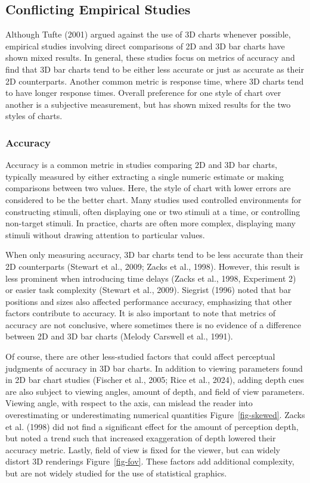 \documentclass[phd]{nuthesis}
\begin{document}
\subsection{Conflicting Empirical
Studies}\label{conflicting-empirical-studies}

Although Tufte (2001) argued against the use of 3D charts whenever
possible, empirical studies involving direct comparisons of 2D and 3D
bar charts have shown mixed results. In general, these studies focus on
metrics of accuracy and find that 3D bar charts tend to be either less
accurate or just as accurate as their 2D counterparts. Another common
metric is response time, where 3D charts tend to have longer response
times. Overall preference for one style of chart over another is a
subjective measurement, but has shown mixed results for the two styles
of charts.

\subsubsection{Accuracy}\label{accuracy}

Accuracy is a common metric in studies comparing 2D and 3D bar charts,
typically measured by either extracting a single numeric estimate or
making comparisons between two values. Here, the style of chart with
lower errors are considered to be the better chart. Many studies used
controlled environments for constructing stimuli, often displaying one
or two stimuli at a time, or controlling non-target stimuli. In
practice, charts are often more complex, displaying many stimuli without
drawing attention to particular values.

When only measuring accuracy, 3D bar charts tend to be less accurate
than their 2D counterparts (Stewart et al., 2009; Zacks et al., 1998).
However, this result is less prominent when introducing time delays
(Zacks et al., 1998, Experiment 2) or easier task complexity (Stewart et
al., 2009). Siegrist (1996) noted that bar positions and sizes also
affected performance accuracy, emphasizing that other factors contribute
to accuracy. It is also important to note that metrics of accuracy are
not conclusive, where sometimes there is no evidence of a difference
between 2D and 3D bar charts (Melody Carswell et al., 1991).

Of course, there are other less-studied factors that could affect
perceptual judgments of accuracy in 3D bar charts. In addition to
viewing parameters found in 2D bar chart studies (Fischer et al., 2005;
Rice et al., 2024), adding depth cues are also subject to viewing
angles, amount of depth, and field of view parameters. Viewing angle,
with respect to the axis, can mislead the reader into overestimating or
underestimating numerical quantities Figure~\ref{fig-skewed}. Zacks et
al. (1998) did not find a significant effect for the amount of
perception depth, but noted a trend such that increased exaggeration of
depth lowered their accuracy metric. Lastly, field of view is fixed for
the viewer, but can widely distort 3D renderings Figure~\ref{fig-fov}.
These factors add additional complexity, but are not widely studied for
the use of statistical graphics.
\end{document}
